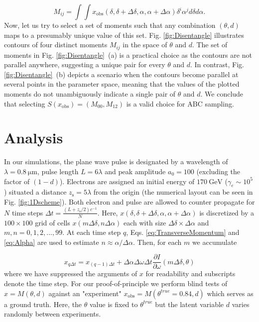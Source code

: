 \documentclass[%
 reprint,
 amsmath,amssymb,
 aps,
]{revtex4-2}
\begin{document}
\begin{equation} \label{eq:SMoments}
    M_{ij} = \int \int x_{\text{obs}}(\delta, \delta+\Delta \delta, \alpha, \alpha+\Delta \alpha) \delta^i \alpha^j d\delta d\alpha.
\end{equation}
Now, let us try to select a set of moments such that any combination $(\theta, d)$ maps to a presumably unique value of this set. Fig. \ref{fig:Disentangle} illustrates contours of four distinct moments $M_{ij}$ in the space of $\theta$ and $d$. The set of moments in Fig. \ref{fig:Disentangle}~(a) is a practical choice as the contours are not parallel anywhere, suggesting a unique pair for every $\theta$ and $d$. In contrast, Fig. \ref{fig:Disentangle}~(b) depicts a scenario when the contours become parallel at several points in the parameter space, meaning that the values of the plotted moments do not unambiguously indicate a single pair of $\theta$ and $d$. We conclude that selecting $S(x_{\text{obs}}) = \left(M_{00}, M_{12}\right)$ is a valid choice for ABC sampling.

\section{Analysis} \label{sec:analysis} 
In our simulations, the plane wave pulse is designated by a wavelength of $\lambda = \SI{0.8}{\micro\meter}$, pulse length $L = 6 \lambda$ and peak amplitude $a_0 = 100$ (excluding the factor of $(1-d)$). Electrons are assigned an initial energy of $170 ~ \si{\giga\electronvolt}$ ($\gamma_e \sim 10^5$) situated a distance $z_{\text{s}} = 5 \lambda$ from the origin (the numerical layout can be seen in Fig. \ref{fig:1Dscheme}). Both electron and pulse are allowed to counter propagate for $N$ time steps $\Delta t = \frac{\left(L + z_{\text{s}}/2 \right)c^{-1}}{N}$. Here, $x(\delta, \delta+\Delta \delta, \alpha, \alpha+\Delta \alpha)$ is discretized by a $100 \times 100$ grid of cells $x(m \Delta \delta, n \Delta \alpha)$ each with size $\Delta \delta \times \Delta \alpha$ and $m,n = 0,1,2,...,99$. At each time step $q$, Eqs. \eqref{eq:TransverseMomentum} and \eqref{eq:Alpha} are used to estimate $n \approx \alpha / \Delta \alpha$. Then, for each $m$ we accumulate 

\begin{equation} \label{eq:Dmn}
x_{q \Delta t} = x_{(q-1) \Delta t} + \Delta \alpha \Delta \omega \Delta t \frac{\partial I}{\partial \omega}\left(m\Delta \delta, \theta \right)
\end{equation}
where we have suppressed the arguments of $x$ for readability and subscripts denote the time step. For our proof-of-principle we perform blind tests of $x = M(\theta, d)$ against an "experiment" $x_{\text{obs}} = M(\theta^{true}=0.84, d)$ which serves as a ground truth. Here, the $\theta$ value is fixed to $\theta^{true}$ but the latent variable $d$ varies randomly between experiments. \\
\end{document}

